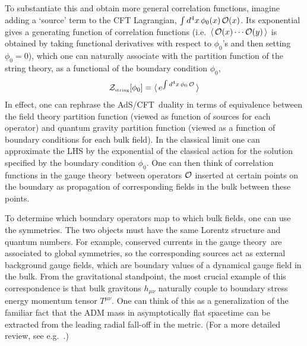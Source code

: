 \documentclass[12pt,a4paper]{article}
\def\AC{AdS/CFT}
\def\GT{gauge theory}
\def\vev#1{\langle\, #1 \, \rangle}
\begin{document}
To substantiate this and obtain more general correlation functions, imagine adding a `source' term to the CFT Lagrangian,
$\int d^4 x \, \phi_0(x) \, {\cal O}(x)$. 
Its exponential gives a generating function of correlation functions (i.e.\ $\vev{{\cal O}(x) \cdots {\cal O}(y)}$ is obtained by taking functional derivatives with respect to $\phi_0$'s and then setting $\phi_0=0$),
which one can naturally associate with the partition function of the string theory, as a functional of the boundary condition $\phi_0$,
%
\begin{equation}
{\cal Z}_{\scriptscriptstyle {\rm string}}[\phi_0] = \vev{ e^{\int d^4x\, \phi_0\, {\cal O}}}
\label{corgen}
\end{equation}	
%
In effect, one can rephrase the \AC\ duality in terms of equivalence between the field theory partition function (viewed as function of sources for each operator) and quantum gravity partition function (viewed as a function of boundary conditions for each bulk field).
In the classical limit one can approximate the LHS by the exponential of the classical action for the solution specified by the boundary condition $\phi_0$.
One can then think of correlation functions in the \GT\ between operators ${\cal O}$ inserted at certain points on the boundary as propagation of corresponding fields in the bulk between these points.

To determine which boundary operators map to which bulk fields, one can use the symmetries.  The two objects must have the same Lorentz structure and quantum numbers.  For example, conserved currents in the \GT\ are associated to global symmetries, so the corresponding sources act as external background gauge fields, which are boundary values of a dynamical gauge field in the bulk.  From the gravitational standpoint, the most crucial example of this correspondence is that bulk gravitons $h_{\mu\nu}$ naturally couple to boundary stress energy momentum tensor $T^{\mu\nu}$.  One can think of this as a generalization of the familiar fact that the ADM mass in asymptotically flat spacetime can be extracted from the leading radial fall-off in the metric.  (For a more detailed review, see e.g.\ \cite{Fischetti:2012rd}.)
\end{document}
